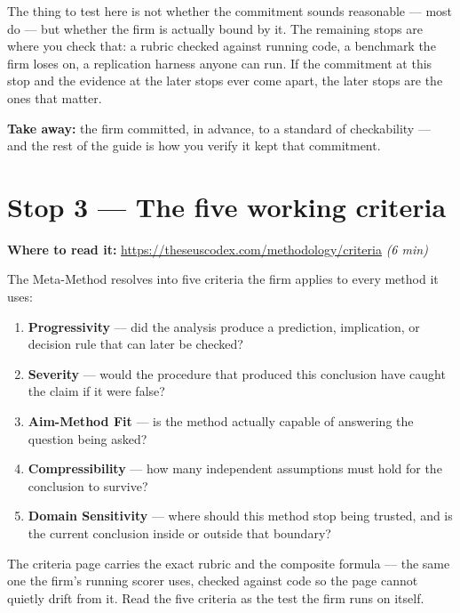 \documentclass[11pt,letterpaper]{article}
\newcommand{\rt}[1]{\textsl{#1}}
\begin{document}
The thing to test here is not whether the commitment sounds reasonable --- most do --- but whether the firm is actually bound by it. The remaining stops are where you check that: a rubric checked against running code, a benchmark the firm loses on, a replication harness anyone can run. If the commitment at this stop and the evidence at the later stops ever come apart, the later stops are the ones that matter.

\textbf{Take away:} the firm committed, in advance, to a standard of checkability --- and the rest of the guide is how you verify it kept that commitment.

\section{Stop 3 --- The five working criteria}

\textbf{Where to read it:} \url{https://theseuscodex.com/methodology/criteria} \quad \rt{(6 min)}

\medskip

The Meta-Method resolves into five criteria the firm applies to every method it uses:

\begin{enumerate}[leftmargin=*,itemsep=0.25em]
  \item \textbf{Progressivity} --- did the analysis produce a prediction, implication, or decision rule that can later be checked?
  \item \textbf{Severity} --- would the procedure that produced this conclusion have caught the claim if it were false?
  \item \textbf{Aim-Method Fit} --- is the method actually capable of answering the question being asked?
  \item \textbf{Compressibility} --- how many independent assumptions must hold for the conclusion to survive?
  \item \textbf{Domain Sensitivity} --- where should this method stop being trusted, and is the current conclusion inside or outside that boundary?
\end{enumerate}

The criteria page carries the exact rubric and the composite formula --- the same one the firm's running scorer uses, checked against code so the page cannot quietly drift from it. Read the five criteria as the test the firm runs on itself.
\end{document}
